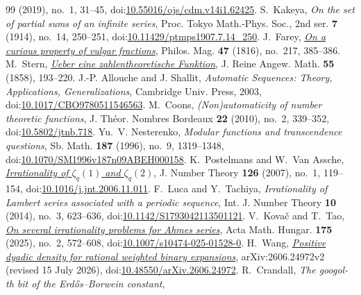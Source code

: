 \documentclass[11pt]{article}
\theoremstyle{definition}
\theoremstyle{remark}
\begin{document}
\begin{thebibliography}{99}
  (2019), no.~1, 31--45,
  doi:\href{https://doi.org/10.55016/ojs/cdm.v14i1.62425}{10.55016/ojs/cdm.v14i1.62425}.
 S.~Kakeya, \emph{On the set of partial sums of an infinite series},
  Proc. Tokyo Math.-Phys. Soc., 2nd ser. \textbf{7} (1914), no.~14, 250--251,
  doi:\href{https://doi.org/10.11429/ptmps1907.7.14_250}{10.11429/ptmps1907.7.14\_250}.
 J.~Farey,
  \href{https://doi.org/10.1080/14786441608628487}{\emph{On a curious property of vulgar fractions}},
  Philos. Mag. \textbf{47} (1816), no.~217, 385--386.
 M.~Stern,
  \href{https://doi.org/10.1515/crll.1858.55.193}{\emph{Ueber eine zahlentheoretische Funktion}},
  J. Reine Angew. Math. \textbf{55} (1858), 193--220.
 J.-P. Allouche and J. Shallit, \emph{Automatic
  Sequences: Theory, Applications, Generalizations}, Cambridge Univ. Press, 2003,
  doi:\href{https://doi.org/10.1017/CBO9780511546563}{10.1017/CBO9780511546563}.
 M.~Coons, \emph{(Non)automaticity of number theoretic
  functions}, J. Th\'eor. Nombres Bordeaux \textbf{22} (2010), no.~2,
  339--352, doi:\href{https://doi.org/10.5802/jtnb.718}{10.5802/jtnb.718}.
 Yu.~V. Nesterenko, \emph{Modular functions and transcendence questions},
  Sb. Math. \textbf{187} (1996), no.~9, 1319--1348,
  doi:\href{https://doi.org/10.1070/SM1996v187n09ABEH000158}{10.1070/SM1996v187n09ABEH000158}.
 K.~Postelmans and W.~Van Assche,
  \href{https://arxiv.org/abs/math/0604312v1}{\emph{Irrationality of $\zeta_q(1)$ and $\zeta_q(2)$}},
  J. Number Theory \textbf{126} (2007), no.~1, 119--154,
  doi:\href{https://doi.org/10.1016/j.jnt.2006.11.011}{10.1016/j.jnt.2006.11.011}.
 F.~Luca and Y.~Tachiya, \emph{Irrationality of Lambert series associated
  with a periodic sequence}, Int. J. Number Theory \textbf{10} (2014), no.~3, 623--636,
  doi:\href{https://doi.org/10.1142/S1793042113501121}{10.1142/S1793042113501121}.
 V.~Kova\v{c} and T.~Tao,
  \href{https://arxiv.org/abs/2406.17593v4}{\emph{On several irrationality problems for
  Ahmes series}}, Acta Math. Hungar. \textbf{175} (2025), no.~2, 572--608,
  doi:\href{https://doi.org/10.1007/s10474-025-01528-0}{10.1007/s10474-025-01528-0}.
 H.~Wang,
  \href{https://arxiv.org/abs/2606.24972v2}{\emph{Positive dyadic density for
  rational weighted binary expansions}}, arXiv:2606.24972v2
  (revised 15 July 2026),
  doi:\href{https://doi.org/10.48550/arXiv.2606.24972}{10.48550/arXiv.2606.24972}.
 R.~Crandall, \emph{The googol-th bit of the Erd\H{o}s--Borwein constant},

\end{thebibliography}
\end{document}
